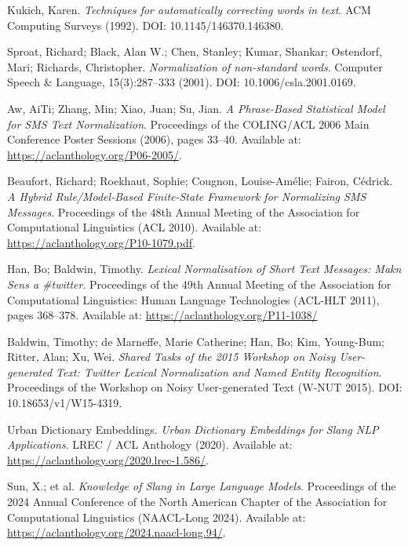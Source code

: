 \documentclass[12pt]{article}
\begin{document}
\begin{thebibliography}{9}
Kukich, Karen.
\textit{Techniques for automatically correcting words in text}.
ACM Computing Surveys (1992).
DOI: 10.1145/146370.146380.

Sproat, Richard; Black, Alan W.; Chen, Stanley; Kumar, Shankar; Ostendorf, Mari; Richards, Christopher.
\textit{Normalization of non-standard words}.
Computer Speech \& Language, 15(3):287–333 (2001).
DOI: 10.1006/csla.2001.0169.

Aw, AiTi; Zhang, Min; Xiao, Juan; Su, Jian.
\textit{A Phrase-Based Statistical Model for SMS Text Normalization}.
Proceedings of the COLING/ACL 2006 Main Conference Poster Sessions (2006), pages 33–40.
Available at: \url{https://aclanthology.org/P06-2005/}.

Beaufort, Richard; Roekhaut, Sophie; Cougnon, Louise-Amélie; Fairon, Cédrick.
\textit{A Hybrid Rule/Model-Based Finite-State Framework for Normalizing SMS Messages}.
Proceedings of the 48th Annual Meeting of the Association for Computational Linguistics (ACL 2010).
Available at: \url{https://aclanthology.org/P10-1079.pdf}.

Han, Bo; Baldwin, Timothy.
\textit{Lexical Normalisation of Short Text Messages: Makn Sens a \#twitter}.
Proceedings of the 49th Annual Meeting of the Association for Computational Linguistics: Human Language Technologies (ACL-HLT 2011), pages 368–378.
Available at: \url{https://aclanthology.org/P11-1038/}

Baldwin, Timothy; de Marneffe, Marie Catherine; Han, Bo; Kim, Young-Bum; Ritter, Alan; Xu, Wei.
\textit{Shared Tasks of the 2015 Workshop on Noisy User-generated Text: Twitter Lexical Normalization and Named Entity Recognition}.
Proceedings of the Workshop on Noisy User-generated Text (W-NUT 2015).
DOI: 10.18653/v1/W15-4319.

Urban Dictionary Embeddings.
\textit{Urban Dictionary Embeddings for Slang NLP Applications}.
LREC / ACL Anthology (2020).
Available at: \url{https://aclanthology.org/2020.lrec-1.586/}.

Sun, X.; et al.
\textit{Knowledge of Slang in Large Language Models}.
Proceedings of the 2024 Annual Conference of the North American Chapter of the Association for Computational Linguistics (NAACL-Long 2024).
Available at: \url{https://aclanthology.org/2024.naacl-long.94/}.


\end{thebibliography}
\end{document}
